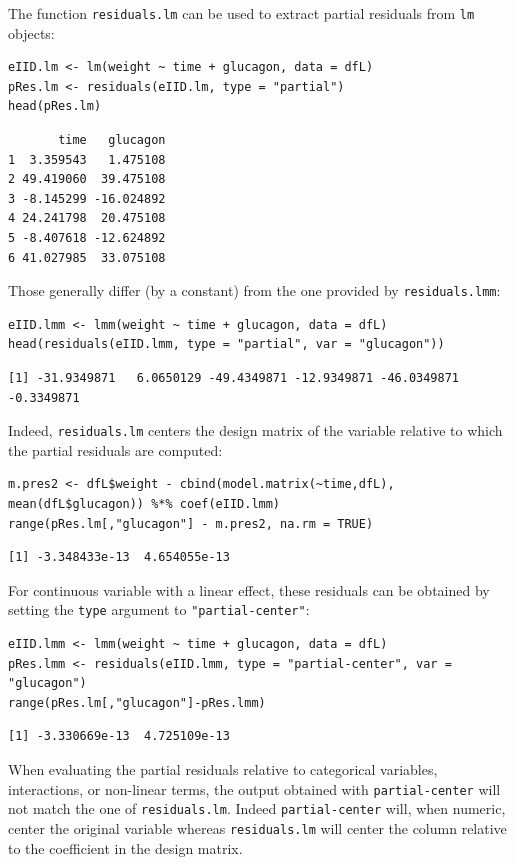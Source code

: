\documentclass[12pt]{article}
\newcommand\Warning[1][3ex]{%
\renewcommand\stacktype{L}%
\scaleto{\stackon[1.3pt]{\color{red}$\triangle$}{\tiny\bfseries !}}{#1}%
\xspace
}
\begin{document}
The function \texttt{residuals.lm} can be used to extract partial residuals
from \texttt{lm} objects:
\lstset{language=r,label= ,caption= ,captionpos=b,numbers=none}
\begin{lstlisting}
eIID.lm <- lm(weight ~ time + glucagon, data = dfL)
pRes.lm <- residuals(eIID.lm, type = "partial")
head(pRes.lm)
\end{lstlisting}

\begin{verbatim}
       time   glucagon
1  3.359543   1.475108
2 49.419060  39.475108
3 -8.145299 -16.024892
4 24.241798  20.475108
5 -8.407618 -12.624892
6 41.027985  33.075108
\end{verbatim}


Those generally differ (by a constant) from the one provided by
\texttt{residuals.lmm}:
\lstset{language=r,label= ,caption= ,captionpos=b,numbers=none}
\begin{lstlisting}
eIID.lmm <- lmm(weight ~ time + glucagon, data = dfL)
head(residuals(eIID.lmm, type = "partial", var = "glucagon"))
\end{lstlisting}

\begin{verbatim}
[1] -31.9349871   6.0650129 -49.4349871 -12.9349871 -46.0349871  -0.3349871
\end{verbatim}


Indeed, \texttt{residuals.lm} centers the design matrix of the variable
relative to which the partial residuals are computed:
\lstset{language=r,label= ,caption= ,captionpos=b,numbers=none}
\begin{lstlisting}
m.pres2 <- dfL$weight - cbind(model.matrix(~time,dfL), mean(dfL$glucagon)) %*% coef(eIID.lmm)
range(pRes.lm[,"glucagon"] - m.pres2, na.rm = TRUE)
\end{lstlisting}

\begin{verbatim}
[1] -3.348433e-13  4.654055e-13
\end{verbatim}


For continuous variable with a linear effect, these residuals can be
obtained by setting the \texttt{type} argument to \texttt{"partial-center"}:
\lstset{language=r,label= ,caption= ,captionpos=b,numbers=none}
\begin{lstlisting}
eIID.lmm <- lmm(weight ~ time + glucagon, data = dfL)
pRes.lmm <- residuals(eIID.lmm, type = "partial-center", var = "glucagon")
range(pRes.lm[,"glucagon"]-pRes.lmm)
\end{lstlisting}

\begin{verbatim}
[1] -3.330669e-13  4.725109e-13
\end{verbatim}


\Warning When evaluating the partial residuals relative to categorical
variables, interactions, or non-linear terms, the output obtained with
\texttt{partial-center} will not match the one of \texttt{residuals.lm}. Indeed
\texttt{partial-center} will, when numeric, center the original variable
whereas \texttt{residuals.lm} will center the column relative to the
coefficient in the design matrix.
\end{document}
